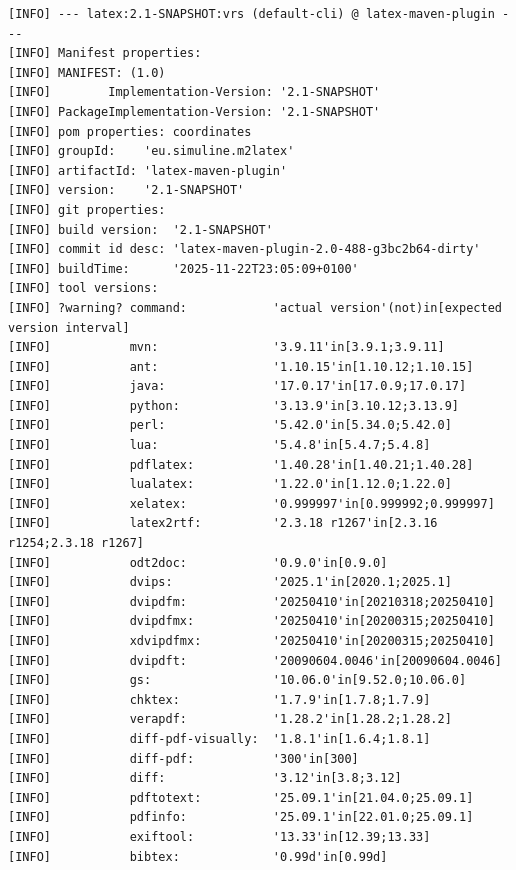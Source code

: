 \begin{lstlisting}[basicstyle=\tiny,
float, captionpos=b, label={lst:vrsOut}, 
caption={Output of goal \texttt{latex:vrs}}]
[INFO] --- latex:2.1-SNAPSHOT:vrs (default-cli) @ latex-maven-plugin ---
[INFO] Manifest properties: 
[INFO] MANIFEST: (1.0)
[INFO]        Implementation-Version: '2.1-SNAPSHOT'
[INFO] PackageImplementation-Version: '2.1-SNAPSHOT'
[INFO] pom properties: coordinates
[INFO] groupId:    'eu.simuline.m2latex'
[INFO] artifactId: 'latex-maven-plugin'
[INFO] version:    '2.1-SNAPSHOT'
[INFO] git properties: 
[INFO] build version:  '2.1-SNAPSHOT'
[INFO] commit id desc: 'latex-maven-plugin-2.0-488-g3bc2b64-dirty'
[INFO] buildTime:      '2025-11-22T23:05:09+0100'
[INFO] tool versions: 
[INFO] ?warning? command:            'actual version'(not)in[expected version interval]
[INFO]           mvn:                '3.9.11'in[3.9.1;3.9.11]
[INFO]           ant:                '1.10.15'in[1.10.12;1.10.15]
[INFO]           java:               '17.0.17'in[17.0.9;17.0.17]
[INFO]           python:             '3.13.9'in[3.10.12;3.13.9]
[INFO]           perl:               '5.42.0'in[5.34.0;5.42.0]
[INFO]           lua:                '5.4.8'in[5.4.7;5.4.8]
[INFO]           pdflatex:           '1.40.28'in[1.40.21;1.40.28]
[INFO]           lualatex:           '1.22.0'in[1.12.0;1.22.0]
[INFO]           xelatex:            '0.999997'in[0.999992;0.999997]
[INFO]           latex2rtf:          '2.3.18 r1267'in[2.3.16 r1254;2.3.18 r1267]
[INFO]           odt2doc:            '0.9.0'in[0.9.0]
[INFO]           dvips:              '2025.1'in[2020.1;2025.1]
[INFO]           dvipdfm:            '20250410'in[20210318;20250410]
[INFO]           dvipdfmx:           '20250410'in[20200315;20250410]
[INFO]           xdvipdfmx:          '20250410'in[20200315;20250410]
[INFO]           dvipdft:            '20090604.0046'in[20090604.0046]
[INFO]           gs:                 '10.06.0'in[9.52.0;10.06.0]
[INFO]           chktex:             '1.7.9'in[1.7.8;1.7.9]
[INFO]           verapdf:            '1.28.2'in[1.28.2;1.28.2]
[INFO]           diff-pdf-visually:  '1.8.1'in[1.6.4;1.8.1]
[INFO]           diff-pdf:           '300'in[300]
[INFO]           diff:               '3.12'in[3.8;3.12]
[INFO]           pdftotext:          '25.09.1'in[21.04.0;25.09.1]
[INFO]           pdfinfo:            '25.09.1'in[22.01.0;25.09.1]
[INFO]           exiftool:           '13.33'in[12.39;13.33]
[INFO]           bibtex:             '0.99d'in[0.99d]

\end{lstlisting}
